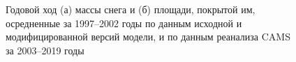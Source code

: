 \documentclass[a4paper, fontsize=12pt]{scrartcl}
\begin{document}
\begin{figure}[h]
    \begin{minipage}[h]{0.48\linewidth}
    \end{minipage}
    \hfill
    \begin{minipage}[h]{0.51\linewidth}
    \end{minipage}
    \caption{Годовой ход (а) массы снега и (б) площади, покрытой им, осредненные за 1997--2002 годы по данным исходной и модифицированной версий модели, и по данным реанализа CAMS за 2003--2019 годы}
    \label{fig:imageSn}
\end{figure}
\end{document}
